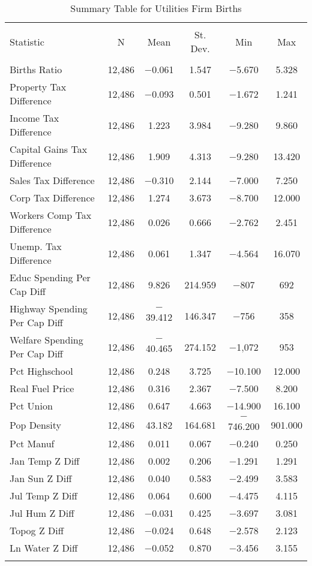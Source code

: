 
\begin{table}[!htbp] \centering 
  \caption{Summary Table for  Utilities Firm Births} 
  \label{22summary} 
\begin{tabular}{@{\extracolsep{5pt}}lccccc} 
\\[-1.8ex]\hline 
\hline \\[-1.8ex] 
Statistic & \multicolumn{1}{c}{N} & \multicolumn{1}{c}{Mean} & \multicolumn{1}{c}{St. Dev.} & \multicolumn{1}{c}{Min} & \multicolumn{1}{c}{Max} \\ 
\hline \\[-1.8ex] 
Births Ratio & 12,486 & $-$0.061 & 1.547 & $-$5.670 & 5.328 \\ 
Property Tax Difference & 12,486 & $-$0.093 & 0.501 & $-$1.672 & 1.241 \\ 
Income Tax Difference & 12,486 & 1.223 & 3.984 & $-$9.280 & 9.860 \\ 
Capital Gains Tax Difference & 12,486 & 1.909 & 4.313 & $-$9.280 & 13.420 \\ 
Sales Tax Difference & 12,486 & $-$0.310 & 2.144 & $-$7.000 & 7.250 \\ 
Corp Tax Difference & 12,486 & 1.274 & 3.673 & $-$8.700 & 12.000 \\ 
Workers Comp Tax Difference & 12,486 & 0.026 & 0.666 & $-$2.762 & 2.451 \\ 
Unemp. Tax Difference & 12,486 & 0.061 & 1.347 & $-$4.564 & 16.070 \\ 
Educ Spending Per Cap Diff & 12,486 & 9.826 & 214.959 & $-$807 & 692 \\ 
Highway Spending Per Cap Diff & 12,486 & $-$39.412 & 146.347 & $-$756 & 358 \\ 
Welfare Spending Per Cap Diff & 12,486 & $-$40.465 & 274.152 & $-$1,072 & 953 \\ 
Pct Highschool & 12,486 & 0.248 & 3.725 & $-$10.100 & 12.000 \\ 
Real Fuel Price & 12,486 & 0.316 & 2.367 & $-$7.500 & 8.200 \\ 
Pct Union & 12,486 & 0.647 & 4.663 & $-$14.900 & 16.100 \\ 
Pop Density & 12,486 & 43.182 & 164.681 & $-$746.200 & 901.000 \\ 
Pct Manuf & 12,486 & 0.011 & 0.067 & $-$0.240 & 0.250 \\ 
Jan Temp Z Diff & 12,486 & 0.002 & 0.206 & $-$1.291 & 1.291 \\ 
Jan Sun Z Diff & 12,486 & 0.040 & 0.583 & $-$2.499 & 3.583 \\ 
Jul Temp Z Diff & 12,486 & 0.064 & 0.600 & $-$4.475 & 4.115 \\ 
Jul Hum Z Diff & 12,486 & $-$0.031 & 0.425 & $-$3.697 & 3.081 \\ 
Topog Z Diff & 12,486 & $-$0.024 & 0.648 & $-$2.578 & 2.123 \\ 
Ln Water Z Diff & 12,486 & $-$0.052 & 0.870 & $-$3.456 & 3.155 \\ 
\hline \\[-1.8ex] 
\end{tabular} 
\end{table} 
